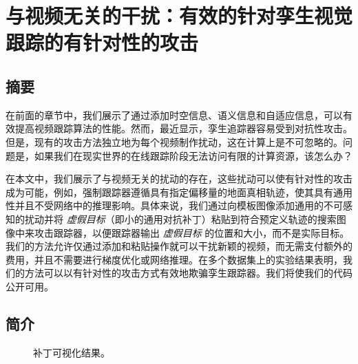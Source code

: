 \chapter{与视频无关的干扰：有效的针对孪生视觉跟踪的有针对性的攻击} \label{chap:attack}

\section{摘要}
在前面的章节中，我们展示了通过添加时空信息、语义信息和自适应信息，可以有效提高视频跟踪算法的性能。然而，最近显示，孪生追踪器容易受到对抗性攻击。但是，现有的攻击方法独立地为每个视频制作扰动，这在计算上是不可忽略的。问题是，如果我们在现实世界的在线跟踪阶段无法访问有限的计算资源，该怎么办？

在本文中，我们展示了与视频无关的扰动的存在，这些扰动可以使有针对性的攻击成为可能，例如，强制跟踪器遵循具有指定偏移量的地面真相轨迹，使其具有通用性并且不受网络中的推理影响。具体来说，我们通过向模板图像添加通用的不可感知的扰动并将 \textit{虚假目标}（即小的通用对抗补丁）粘贴到符合预定义轨迹的搜索图像中来攻击跟踪器，以便跟踪器输出 \textit{虚假目标} 的位置和大小，而不是实际目标。我们的方法允许仅通过添加和粘贴操作就可以干扰新颖的视频，而无需支付额外的费用，并且不需要进行梯度优化或网络推理。在多个数据集上的实验结果表明，我们的方法可以以有针对性的攻击方式有效地欺骗孪生跟踪器。我们将使我们的代码公开可用。

\section{简介}

\begin{figure}[t]
\centering
{} \qquad 
{}
\caption{补丁可视化结果。}
\end{figure}

